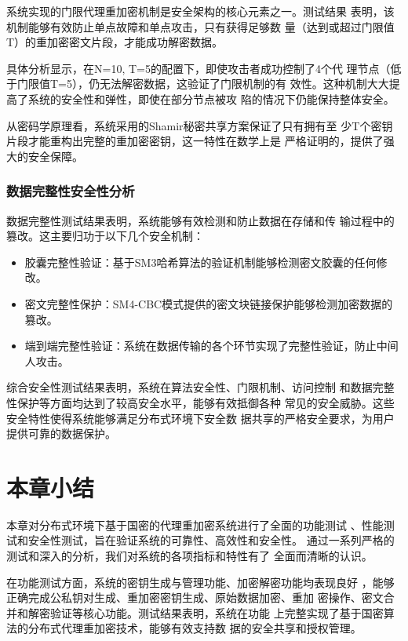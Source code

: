 系统实现的门限代理重加密机制是安全架构的核心元素之一。测试结果
表明，该机制能够有效防止单点故障和单点攻击，只有获得足够数
量（达到或超过门限值T）的重加密密文片段，才能成功解密数据。

具体分析显示，在N=10, T=5的配置下，即使攻击者成功控制了4个代
理节点（低于门限值T=5），仍无法解密数据，这验证了门限机制的有
效性。这种机制大大提高了系统的安全性和弹性，即使在部分节点被攻
陷的情况下仍能保持整体安全。

从密码学原理看，系统采用的Shamir秘密共享方案保证了只有拥有至
少T个密钥片段才能重构出完整的重加密密钥，这一特性在数学上是
严格证明的，提供了强大的安全保障。

\subsubsection{数据完整性安全性分析}

数据完整性测试结果表明，系统能够有效检测和防止数据在存储和传
输过程中的篡改。这主要归功于以下几个安全机制：

\begin{itemize}
	\item 胶囊完整性验证：基于SM3哈希算法的验证机制能够检测密文胶囊的任何修改。
	\item 密文完整性保护：SM4-CBC模式提供的密文块链接保护能够检测加密数据的篡改。
	\item 端到端完整性验证：系统在数据传输的各个环节实现了完整性验证，防止中间人攻击。
\end{itemize}

综合安全性测试结果表明，系统在算法安全性、门限机制、访问控制
和数据完整性保护等方面均达到了较高安全水平，能够有效抵御各种
常见的安全威胁。这些安全特性使得系统能够满足分布式环境下安全数
据共享的严格安全要求，为用户提供可靠的数据保护。

\section{本章小结}

本章对分布式环境下基于国密的代理重加密系统进行了全面的功能测试
、性能测试和安全性测试，旨在验证系统的可靠性、高效性和安全性。
通过一系列严格的测试和深入的分析，我们对系统的各项指标和特性有了
全面而清晰的认识。

在功能测试方面，系统的密钥生成与管理功能、加密解密功能均表现良好
，能够正确完成公私钥对生成、重加密密钥生成、原始数据加密、重加
密操作、密文合并和解密验证等核心功能。测试结果表明，系统在功能
上完整实现了基于国密算法的分布式代理重加密技术，能够有效支持数
据的安全共享和授权管理。

